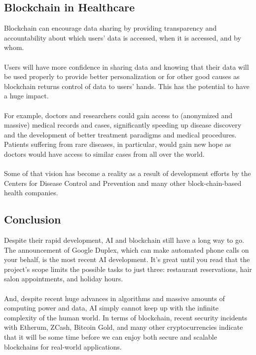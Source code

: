 \documentclass[12pt,letterpaper]{article}
\begin{document}
\pagebreak
    \subsection*{Blockchain in Healthcare}
    Blockchain can encourage data sharing by providing transparency and accountability about which users' data is accessed, when it is accessed, and by whom.
    \\
    \\
    Users will have more confidence in sharing data and knowing that their data will be used properly to provide better personalization or for other good causes as blockchain returns control of data to users' hands. This has the potential to have a huge impact.
    \\
    \\
    For example, doctors and researchers could gain access to (anonymized and massive) medical records and cases, significantly speeding up disease discovery and the development of better treatment paradigms and medical procedures. Patients suffering from rare diseases, in particular, would gain new hope as doctors would have access to similar cases from all over the world.
    \\
    \\
    Some of that vision has become a reality as a result of development efforts by the Centers for Disease Control and Prevention and many other block-chain-based health companies.
\pagebreak
  \subsection*{Conclusion}
  Despite their rapid development, AI and blockchain still have a long way to go. The announcement of Google Duplex, which can make automated phone calls on your behalf, is the most recent AI development. It's great until you read that the project's scope limits the possible tasks to just three: restaurant reservations, hair salon appointments, and holiday hours.
  \\
  \\
  And, despite recent huge advances in algorithms and massive amounts of computing power and data, AI simply cannot keep up with the infinite complexity of the human world. In terms of blockchain, recent security incidents with Etherum, ZCash, Bitcoin Gold, and many other cryptocurrencies indicate that it will be some time before we can enjoy both secure and scalable blockchains for real-world applications.
  
\end{document}
